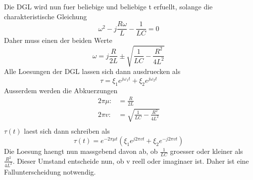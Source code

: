 \documentclass[titlepage=firstcover, captions=tableheading]{scrartcl}
\begin{document}
Die DGL wird nun fuer beliebige \xi und beliebige t erfuellt, solange \omega die charakteristische Gleichung 
\begin{equation}
    \omega^2-j\frac{R\omega}{L}-\frac{1}{LC}=0 \nonumber
\end{equation}
Daher muss \omega einen der beiden Werte 
\begin{equation}
    \omega=j\frac{R}{2L}\pm \sqrt{\frac{1}{LC}-\frac{R^2}{4L^2}}\nonumber
\end{equation}
Alle Loesungen der DGL lassen sich dann ausdruecken als 
\begin{equation}
    \tau=\xi_1e^{j\omega_1t}+\xi_2e^{j\omega_2t}\nonumber
\end{equation}
Ausserdem werden die Abkuerzungen 
\begin{align}
    2\pi\mu:&=\frac{R}{2L}\nonumber\\
    2\pi v:&=\sqrt{\frac{1}{LC}-\frac{R^2}{4L^2}}\nonumber\\
\end{align}
$\tau(t)$ laest sich dann schreiben als
\begin{equation}\label{Klammer}
    \tau(t)=e^{-2\pi\mu t}(\xi_1e^{j2\pi vt}+\xi_2e^{-j2\pi vt})
\end{equation}
Die Loesung haengt nun massgebend davon ab, ob $\frac{1}{LC}$ groesser oder kleiner als $\frac{R^2}{4L^2}$. Dieser Umstand entscheide nun, ob v reell oder imaginaer ist. Daher ist eine Fallunterscheidung notwendig.
\end{document}
